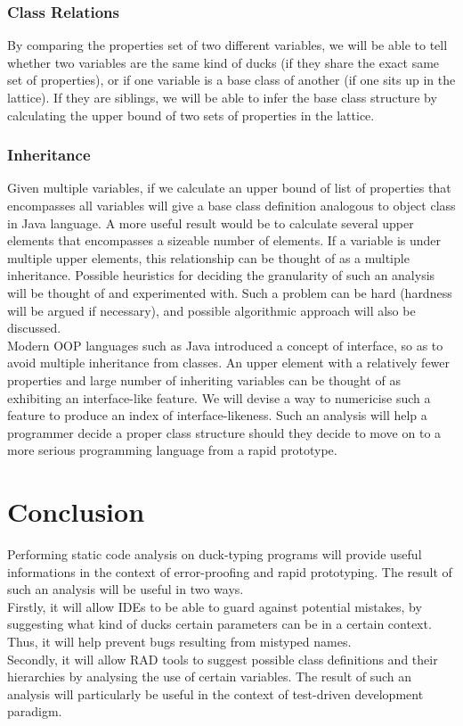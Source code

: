 \documentclass[a4paper,12pt]{article}
\begin{document}
\subsubsection{Class Relations}
By comparing the properties set of two different variables, we will be able to tell whether two variables are the same kind of ducks (if they share the exact same set of properties), or if one variable is a base class of another (if one sits up in the lattice). If they are siblings, we will be able to infer the base class structure by calculating the upper bound of two sets of properties in the lattice.
\subsubsection{Inheritance}
Given multiple variables, if we calculate an upper bound of list of properties that encompasses all variables will give a base class definition analogous to object class in Java language. A more useful result would be to calculate several upper elements that encompasses a sizeable number of elements. If a variable is under multiple upper elements, this relationship can be thought of as a multiple inheritance. Possible heuristics for deciding the granularity of such an analysis will be thought of and experimented with. Such a problem can be hard (hardness will be argued if necessary), and possible algorithmic approach will also be discussed.\\
Modern OOP languages such as Java introduced a concept of interface, so as to 
avoid multiple inheritance from classes. An upper element with a relatively 
fewer properties and large number of inheriting variables can be thought of 
as exhibiting an interface-like feature. We will devise a way to numericise 
such a feature to produce an index of interface-likeness. Such an analysis 
will help a programmer decide a proper class structure should they decide to 
move on to a more serious programming language from a rapid prototype.
\section{Conclusion}
Performing static code analysis on duck-typing programs will provide useful 
informations in the context of error-proofing and rapid prototyping. The 
result of such an analysis will be useful in two ways.\\ 
Firstly, it will allow IDEs to be able to guard against potential mistakes, 
by suggesting what kind of ducks certain parameters can be in a certain 
context. Thus, it will help prevent bugs resulting from mistyped names.\\
Secondly, it will allow RAD tools to suggest possible class definitions and 
their hierarchies by analysing the use of certain variables. The result of 
such an analysis will particularly be useful in the context of test-driven 
development paradigm.\\
\end{document}
